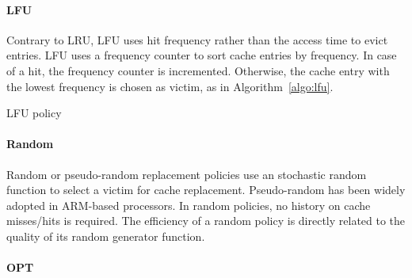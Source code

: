 \paragraph{LFU}

Contrary to LRU, LFU uses hit frequency rather than the access time to evict entries.
LFU uses a frequency counter to sort cache entries by frequency.
In case of a hit, the frequency counter is incremented.
Otherwise, the cache entry with the lowest frequency is chosen as victim, as in Algorithm~\ref{algo:lfu}.

\begin{algorithm}[]
	\caption{LFU policy}
	\label{algo:lfu}
	\SetInd{0.1em}{.9em}
	\SetAlgoLined
	\footnotesize
\end{algorithm}

\paragraph{Random}

Random or pseudo-random replacement policies use an stochastic random function to select a victim for cache replacement.
Pseudo-random has been widely adopted in ARM-based processors.
In random policies, no history on cache misses/hits is required.
The efficiency of a random policy is directly related to the quality of its random generator function.

\paragraph{OPT}


